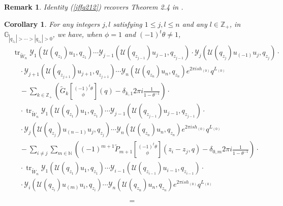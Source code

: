 \documentclass[9pt]{amsart}
\newtheorem{corollary}{Corollary}[section]
\newtheorem{remark}{Remark}[section]
\newcommand{\Y}{\mathcal{Y}}
\begin{document}
\begin{remark}
Identity (\ref{iffq212}) recovers Theorem 2.4 in \cite{huang2005differential}.
\end{remark}
\begin{corollary}
For any integers $j, l$ satisfying $1 \leq j, l \leq n$ and any $l \in \mathbb{Z}_{+}$, in $\mathbb{G}_{|q_{z_1}| > \cdots > |q_{z_n}| > 0}$, we have, when $\phi = 1$ and $(-1)^t \theta \neq 1$,
\begin{equation}\label{iffq214}
\begin{aligned}
  &\operatorname{tr}_{\tilde{W}_n} \Y_1(\mathcal{U}(q_{z_1})u_1, q_{z_1}) \cdots \Y_{j-1}(\mathcal{U}(q_{z_{j-1}})u_{j-1}, q_{z_{j-1}}) \cdot \Y_j(\mathcal{U}(q_{z_j})u_{(-1)}u_j, q_{z_j}) \cdot \\
  &\quad\cdot \Y_{j+1}(\mathcal{U}(q_{z_{j+1}})u_{j+1}, q_{z_{j+1}}) \cdots \Y_n(\mathcal{U}(q_{z_n})u_n, q_{z_n}) e^{2\pi i s h_{(0)}} q^{L_{(0)}} \\
  &\quad- \sum_{k \in \mathbb{Z}_+} \left( \tilde{G}_k\genfrac[]{0pt}{0}{(-1)^t \theta}{\phi}(q) - \delta_{k,1} 2\pi i \frac{1}{1 - \theta^{-1}} \right) \cdot \\
  &\quad\cdot \operatorname{tr}_{\tilde{W}_n} \Y_1(\mathcal{U}(q_{z_1})u_1, q_{z_1}) \cdots \Y_{j-1}(\mathcal{U}(q_{z_{j-1}})u_{j-1}, q_{z_{j-1}}) \cdot \\
  &\quad\cdot \Y_j(\mathcal{U}(q_{z_j})u_{(n-1)}u_j, q_{z_j}) \cdots \Y_n(\mathcal{U}(q_{z_n})u_n, q_{z_n}) e^{2\pi i s h_{(0)}} q^{L_{(0)}} \\
  &\quad- \sum_{i \neq j} \sum_{m \in \mathbb{N}} \left( (-1)^{m+1} \tilde{P}_{m+1}\genfrac[]{0pt}{0}{(-1)^t \theta}{\phi}(z_i - z_j, q) - \delta_{0,m} 2\pi i \frac{1}{1 - \theta^{-1}} \right) \cdot \\
  &\quad\cdot \operatorname{tr}_{\tilde{W}_n} \Y_1(\mathcal{U}(q_{z_1})u_1, q_{z_1}) \cdots \Y_{i-1}(\mathcal{U}(q_{z_{i-1}})u_{i-1}, q_{z_{i-1}}) \cdot \\
  &\quad\cdot \Y_i(\mathcal{U}(q_{z_i})u_{(m)}u_i, q_{z_i}) \cdots \Y_n(\mathcal{U}(q_{z_n})u_n, q_{z_n}) e^{2\pi i s h_{(0)}} q^{L_{(0)}}
\end{aligned}
\end{equation}

\vspace{-1.2em}

\[ =\]

\vspace{-1.2em}


\end{corollary}
\end{document}
